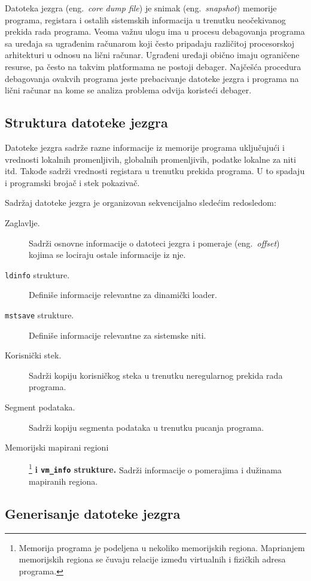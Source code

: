 \documentclass[12pt,oneside]{memoir}
\begin{document}
Datoteka jezgra (eng.~\emph{core dump file}) je snimak (eng.~\emph{snapshot}) memorije programa, registara i ostalih sistemskih informacija u trenutku neočekivanog prekida rada programa. Veoma važnu ulogu ima u procesu debagovanja programa sa uređaja sa ugrađenim računarom koji često pripadaju različitoj procesorskoj arhitekturi u odnosu na lični računar. Ugrađeni uređaji obično imaju ograničene resurse, pa često na takvim platformama ne postoji debager. Najčešća procedura debagovanja ovakvih programa jeste prebacivanje datoteke jezgra i programa na lični računar na kome se analiza problema odvija koristeći debager.

\subsection{Struktura datoteke jezgra}

Datoteke jezgra sadrže razne informacije iz memorije programa uključujući i vrednosti lokalnih promenljivih, globalnih promenljivih, podatke lokalne za niti itd. Takođe sadrži vrednosti registara u trenutku prekida programa. U to spadaju i programski brojač i stek pokazivač.

Sadržaj datoteke jezgra je organizovan sekvencijalno sledećim redosledom:

\begin{description}
	\item[Zaglavlje.]
	Sadrži osnovne informacije o datoteci jezgra i pomeraje (eng.\emph{~offset}) kojima se lociraju ostale informacije iz nje.
	\item[\texttt{ldinfo} strukture.]   
	Definiše informacije relevantne za dinamički loader.
	\item[\texttt{mstsave} strukture.]
	Definiše informacije relevantne za sistemske niti.
	\item[Korisnički stek.]
	Sadrži kopiju korisničkog steka u trenutku neregularnog prekida rada programa.
	\item[Segment podataka.]   
	Sadrži kopiju segmenta podataka u trenutku pucanja programa.
	\item[Memorijski mapirani regioni]\footnote{Memorija programa je podeljena u nekoliko memorijskih regiona. Maprianjem memorijskih regiona se čuvaju relacije između virtualnih i fizičkih adresa programa.} \textbf{i \texttt{vm\_info} strukture.}
	Sadrži informacije o pomerajima i dužinama mapiranih regiona.
\end{description}

\subsection{Generisanje datoteke jezgra}
\end{document}
